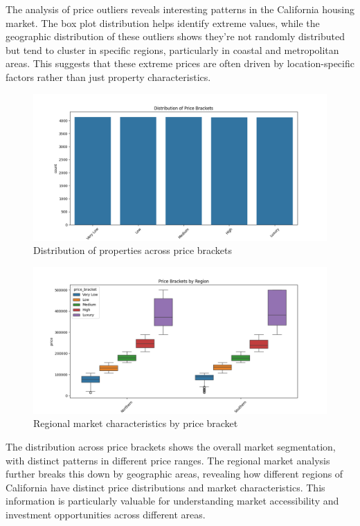 \documentclass[a4paper, 11pt]{article}
\begin{document}
The analysis of price outliers reveals interesting patterns in the California housing market. The box plot distribution helps identify extreme values, while the geographic distribution of these outliers shows they're not randomly distributed but tend to cluster in specific regions, particularly in coastal and metropolitan areas. This suggests that these extreme prices are often driven by location-specific factors rather than just property characteristics.

\begin{figure}[h]
    \centering
    \includegraphics[width=0.8\linewidth]{figs/price_brackets.png}
    \caption{Distribution of properties across price brackets}
    \label{fig:price_brackets}
\end{figure}

\begin{figure}[h]
    \centering
    \includegraphics[width=\linewidth]{figs/regional_markets.png}
    \caption{Regional market characteristics by price bracket}
    \label{fig:regional_markets}
\end{figure}

The distribution across price brackets shows the overall market segmentation, with distinct patterns in different price ranges. The regional market analysis further breaks this down by geographic areas, revealing how different regions of California have distinct price distributions and market characteristics. This information is particularly valuable for understanding market accessibility and investment opportunities across different areas.
\end{document}
